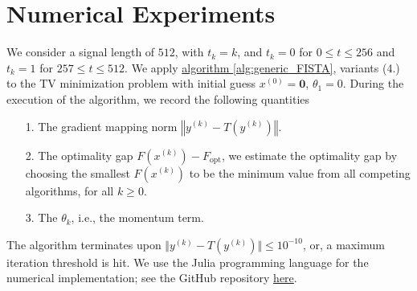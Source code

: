 \documentclass[]{article}
\theoremstyle{definition}
\numberwithin{equation}{subsection}
\begin{document}
\section{Numerical Experiments}\label{sec:numerics}
    We consider a signal length of $512$, with $t_k = k$, and $t_k = 0$ for $0\le t \le 256$ and $t_k = 1$ for $257\le t\le 512$. 
    We apply \hyperref[alg:generic_FISTA]{algorithm \ref*{alg:generic_FISTA}}, variants (4.) to the TV minimization problem with initial guess $x^{(0)} = \mathbf 0$, $\theta_1 = 0$. 
    During the execution of the algorithm, we record the following quantities 
    \begin{itemize}
        \item [1.] The gradient mapping norm $\left\Vert y^{(k)} - T(y^{(k)})\right\Vert$. 
        \item [2.] The optimality gap $F(x^{(k)}) - F_{\text{opt}}$, we estimate the optimality gap by choosing the smallest $F(x^{(k)})$ to be the minimum value from all competing algorithms, for all $k\ge 0$. 
        \item [3.] The $\theta_k$, i.e., the momentum term. 
    \end{itemize}
    The algorithm terminates upon $\Vert y^{(k)} - T(y^{(k)}) \Vert \le 10^{-10}$, or, a maximum iteration threshold is hit. 
    We use the Julia programming language \cite{bezanson_julia_2017} for the numerical implementation; see the GitHub repository \href{https://github.com/iluvjava/Proximal-Gradient/tree/main/applications}{here}.
\end{document}
